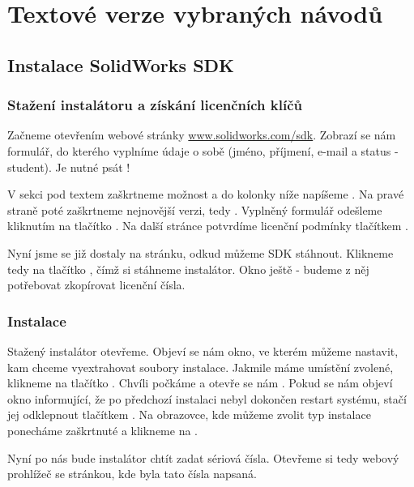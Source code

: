 \chapter{Textové verze vybraných návodů}
\section{Instalace SolidWorks SDK}

\subsection{Stažení instalátoru a získání licenčních klíčů}
Začneme otevřením webové stránky \href{http://www.solidworks.com/sdk}{www.solidworks.com/sdk}.
Zobrazí se nám formulář, do kterého vyplníme údaje o sobě (jméno, příjmení, e-mail a status - student).
Je nutné psát !

\fxnote[author=PŠ]{\textcolor{mygreen}{Sem přijde screenshot formulářes}}

V sekci  pod textem  zaškrtneme možnost  a do kolonky níže napíšeme .
Na pravé straně poté zaškrtneme nejnovější verzi, tedy .
Vyplněný formulář odešleme kliknutím na tlačítko .
Na další stránce potvrdíme licenční podmínky tlačítkem .

Nyní jsme se již dostaly na stránku, odkud můžeme SDK stáhnout.
Klikneme tedy na tlačítko , čímž si stáhneme instalátor.
Okno ještě  - budeme z něj potřebovat zkopírovat licenční čísla. 

\subsection{Instalace}
Stažený instalátor otevřeme. 
Objeví se nám okno, ve kterém můžeme nastavit, kam chceme vyextrahovat soubory instalace.
Jakmile máme umístění zvolené, klikneme na tlačítko .
Chvíli počkáme a otevře se nám .
Pokud se nám objeví okno informující, že po předchozí instalaci nebyl dokončen restart systému, stačí jej odklepnout tlačítkem .
Na obrazovce, kde můžeme zvolit typ instalace ponecháme zaškrtnuté  a klikneme na .

Nyní po nás bude instalátor chtít zadat sériová čísla. 
Otevřeme si tedy webový prohlížeč se stránkou, kde byla tato čísla napsaná.


\newpage